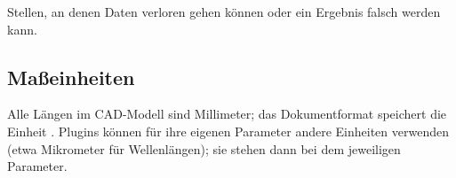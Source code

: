 \begin{warnung}
Stellen, an denen Daten verloren gehen können oder ein Ergebnis falsch werden kann.
\end{warnung}

\subsection*{Maßeinheiten}

Alle Längen im CAD-Modell sind Millimeter; das Dokumentformat speichert die Einheit
. Plugins können für ihre eigenen Parameter andere Einheiten verwenden (etwa
Mikrometer für Wellenlängen); sie stehen dann bei dem jeweiligen Parameter.
